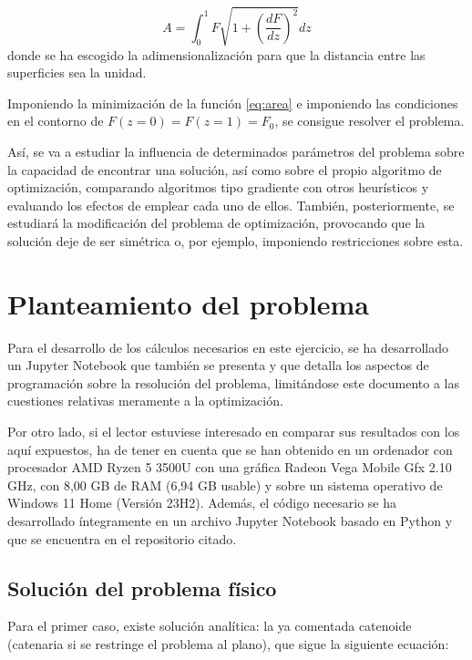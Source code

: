 \begin{equation} \label{eq:area}
    A = \int_0^1 F \sqrt{1 + \left( \frac{dF}{dz} \right)^2} dz
\end{equation}
donde se ha escogido la adimensionalización para que la distancia entre las superficies sea la unidad.

Imponiendo la minimización de la función \ref{eq:area} e imponiendo las condiciones en el contorno de $F(z = 0) = F(z = 1) = F_0$, se consigue resolver el problema.

Así, se va a estudiar la influencia de determinados parámetros del problema sobre la capacidad de encontrar una solución, así como sobre el propio algoritmo de optimización, comparando algoritmos tipo gradiente con otros heurísticos y evaluando los efectos de emplear cada uno de ellos. También, posteriormente, se estudiará la modificación del problema de optimización, provocando que la solución deje de ser simétrica o, por ejemplo, imponiendo restricciones sobre esta.

\section{Planteamiento del problema}

Para el desarrollo de los cálculos necesarios en este ejercicio, se ha desarrollado un Jupyter Notebook\cite{repositorio} que también se presenta y que detalla los aspectos de programación sobre la resolución del problema, limitándose este documento a las cuestiones relativas meramente a la optimización.

Por otro lado, si el lector estuviese interesado en comparar sus resultados con los aquí expuestos, ha de tener en cuenta que se han obtenido en un ordenador con procesador AMD Ryzen 5 3500U con una gráfica Radeon Vega Mobile Gfx 2.10 GHz, con 8,00 GB de RAM (6,94 GB usable) y sobre un sistema operativo de Windows 11 Home (Versión 23H2). Además, el código necesario se ha desarrollado íntegramente en un archivo Jupyter Notebook basado en Python y que se encuentra en el repositorio citado.


\subsection{Solución del problema físico}

Para el primer caso, existe solución analítica: la ya comentada catenoide (catenaria si se restringe el problema al plano), que sigue la siguiente ecuación:

